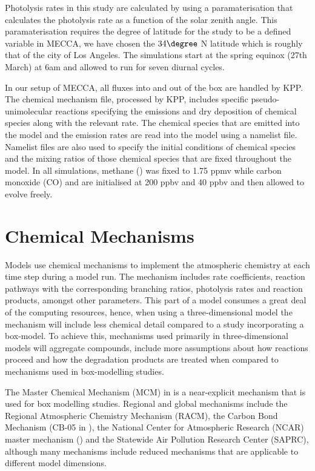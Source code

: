 Photolysis rates in this study are calculated by using a paramaterisation that calculates the photolysis rate as a function of the solar zenith angle.
This paramaterisation requires the degree of latitude for the study to be a defined variable in MECCA, we have chosen the $34\degree$ N latitude which is roughly that of the city of Los Angeles.
The simulations start at the spring equinox (27th March) at 6am and allowed to run for seven diurnal cycles.

In our setup of MECCA, all fluxes into and out of the box are handled by KPP.
The chemical mechanism file, processed by KPP, includes specific pseudo-unimolecular reactions specifying the emissions and dry deposition of chemical species along with the relevant rate.
The chemical species that are emitted into the model and the emission rates are read into the model using a namelist file.
Namelist files are also used to specify the initial conditions of chemical species and the mixing ratios of those chemical species that are fixed throughout the model.
In all simulations, methane () was fixed to 1.75 ppmv while carbon monoxide (CO) and  are initialised at 200 ppbv and 40 ppbv and then allowed to evolve freely.

\section{Chemical Mechanisms}
Models use chemical mechanisms to implement the atmospheric chemistry at each time step during a model run. 
The mechanism includes rate coefficients, reaction pathways with the corresponding branching ratios, photolysis rates and reaction products, amongst other parameters. 
This part of a model consumes a great deal of the computing resources, hence, when using a three-dimensional model the mechanism will include less chemical detail compared to a study incorporating a box-model. 
To achieve this, mechanisms used primarily in three-dimensional models will aggregate compounds, include more assumptions about how reactions proceed and how the degradation products are treated when compared to mechanisms used in box-modelling studies.

The Master Chemical Mechanism (MCM) in \citep{Saunders:2003, Jenkin:2003} is a near-explicit mechanism that is used for box modelling studies. 
Regional and global mechanisms include the Regional Atmospheric Chemistry Mechanism (RACM), the Carbon Bond Mechanism (CB-05 in \citep{Yarwood:2005}), the National Center for Atmospheric Research (NCAR) master mechanism (\citep{Madronich:1989}) and the Statewide Air Pollution Research Center (SAPRC), although many mechanisms include reduced mechanisms that are applicable to different model dimensions. 

